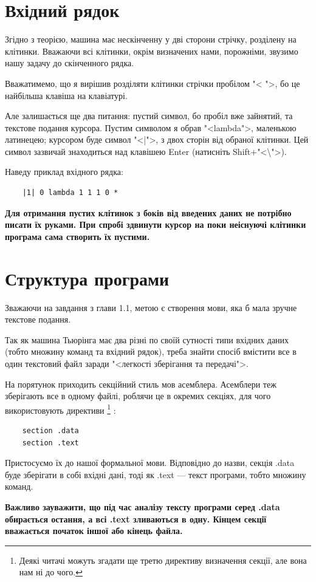 \documentclass[oneside,final,14pt]{extreport}
\begin{document}
\section{Вхідний рядок}
Згідно з теорією, машина має нескінченну у дві сторони стрічку, розділену на клітинки. Вважаючи всі клітинки, окрім визначених нами, порожніми, звузимо нашу задачу до скінченного рядка.

Вважатимемо, що я вирішив розділяти клітинки стрічки пробілом "< ">, бо це найбільша клавіша на клавіатурі. 

Але залишається ще два питання: пустий символ, бо пробіл вже зайнятий, та текстове подання курсора. Пустим символом я обрав "<lambda">, маленькою латинецею; курсором буде символ "<|">, з двох сторін від обраної клітинки. Цей символ зазвичай знаходиться над клавішею Enter (натисніть Shift+"<\textbackslash{}">).

Наведу приклад вхідного рядка:
\begin{verbatim}
	|1| 0 lambda 1 1 1 0 *
\end{verbatim}

{\bfseries Для отримання пустих клітинок з боків від введених даних не потрібно писати їх руками. При спробі здвинути курсор на поки неіснуючі клітинки програма сама створить їх пустими.}

\section{Структура програми}
Зважаючи на завдання з глави 1.1, метою є створення мови, яка б мала зручне текстове подання.

Так як машина Тьюрінга має два різні по своїй сутності типи вхідних даних (тобто множину команд та вхідний рядок), треба знайти спосіб вмістити все в один текстовий файл заради  "<легкості зберігання та передачі">.

На порятунок приходить секційний стиль мов асемблера.
Асемблери теж зберігають все в одному файлі, роблячи це в окремих секціях, для чого використовують директиви
\footnote{Деякі читачі можуть згадати ще третю директиву визначення секції, але вона нам ні до чого.}
:
\begin{verbatim}
	section .data
	section .text
\end{verbatim}
Пристосуємо їх до нашої формальної мови. Відповідно до назви, секція .data буде зберігати в собі вхідні дані, тоді як .text --- текст програми, тобто множину команд.

{\bfseries Важливо зауважити, що під час аналізу тексту програми серед .data обирається остання, а всі .text зливаються в одну. Кінцем секції вважається початок іншої або кінець файла.}
\end{document}
